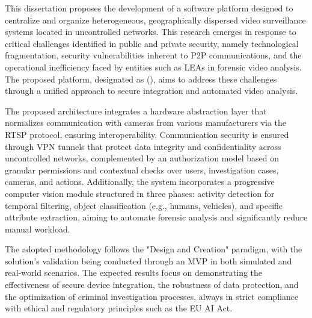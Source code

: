 \begin{abstractotherlanguage}

This dissertation proposes the development of a software platform designed to centralize and organize heterogeneous, geographically dispersed video surveillance systems located in uncontrolled networks. This research emerges in response to critical challenges identified in public and private security, namely technological fragmentation, security vulnerabilities inherent to \gls{P2P} communications, and the operational inefficiency faced by entities such as \glspl{LEA} in forensic video analysis. The proposed platform, designated as  (), aims to address these challenges through a unified approach to secure integration and automated video analysis.

The proposed architecture integrates a hardware abstraction layer that normalizes communication with cameras from various manufacturers via the \gls{RTSP} protocol, ensuring interoperability. Communication security is ensured through \gls{VPN} tunnels that protect data integrity and confidentiality across uncontrolled networks, complemented by an authorization model based on granular permissions and contextual checks over users, investigation cases, cameras, and actions. Additionally, the system incorporates a progressive computer vision module structured in three phases: activity detection for temporal filtering, object classification (e.g., humans, vehicles), and specific attribute extraction, aiming to automate forensic analysis and significantly reduce manual workload.

The adopted methodology follows the "Design and Creation" paradigm, with the solution's validation being conducted through an \gls{MVP} in both simulated and real-world scenarios. The expected results focus on demonstrating the effectiveness of secure device integration, the robustness of data protection, and the optimization of criminal investigation processes, always in strict compliance with ethical and regulatory principles such as the EU AI Act.

\end{abstractotherlanguage}


